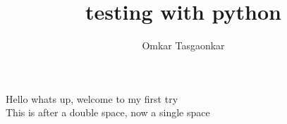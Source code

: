 \documentclass{article}
\title{testing with python}
\author{Omkar Tasgaonkar}
\begin{document}
\maketitle
Hello whats up, welcome to my first try\\
This is after a double space, now a single space
\end{document}
